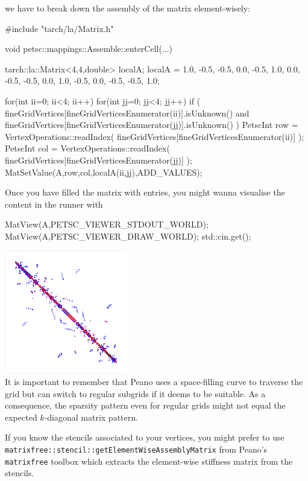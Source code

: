 \noindent
we have to break down the assembly of the matrix element-wisely:

\begin{code}
#include "tarch/la/Matrix.h"

void petsc::mappings::Assemble::enterCell(...) {
 tarch::la::Matrix<4,4,double> localA;
 localA =  1.0,  -0.5, -0.5,  0.0,
          -0.5,   1.0,  0.0, -0.5,
          -0.5,   0.0,  1.0, -0.5,
           0.0,  -0.5, -0.5,  1.0;

 for(int ii=0; ii<4; ii++)
 for(int jj=0; jj<4; jj++) {
  if (
   fineGridVertices[fineGridVerticesEnumerator(ii)].isUnknown()
   and
   fineGridVertices[fineGridVerticesEnumerator(jj)].isUnknown()
  ) {
   PetscInt row = VertexOperations::readIndex( 
     fineGridVertices[fineGridVerticesEnumerator(ii)] );
   PetscInt col = VertexOperations::readIndex( 
     fineGridVertices[fineGridVerticesEnumerator(jj)] );
   MatSetValue(A,row,col,localA(ii,jj),ADD_VALUES);
  }
 }
}
\end{code}

\noindent
Once you have filled the matrix with entries, you might wanna visualise the
content in the runner with
\begin{code}
  MatView(A,PETSC_VIEWER_STDOUT_WORLD);
  MatView(A,PETSC_VIEWER_DRAW_WORLD);
  std::cin.get();
\end{code}

\pagebreak


\begin{center}
  \includegraphics[width=0.4\textwidth]{43_dg/matrix-pattern.png}
  \\
  {
  \footnotesize
  It is important to remember that Peano uses a space-filling curve to traverse
  the grid but can switch to regular subgrids if it deems to be suitable. As a
  consequence, the sparsity pattern even for regular grids might not equal the
  expected $k$-diagonal matrix pattern.
  }
\end{center}

\begin{remark}
  If you know the stencils associated to your vertices, you might prefer to use
  \texttt{matrixfree::stencil::getElementWiseAssemblyMatrix} from Peano's
  \texttt{matrixfree} toolbox which extracts the element-wise stiffness matrix
  from the stencils.
\end{remark}


